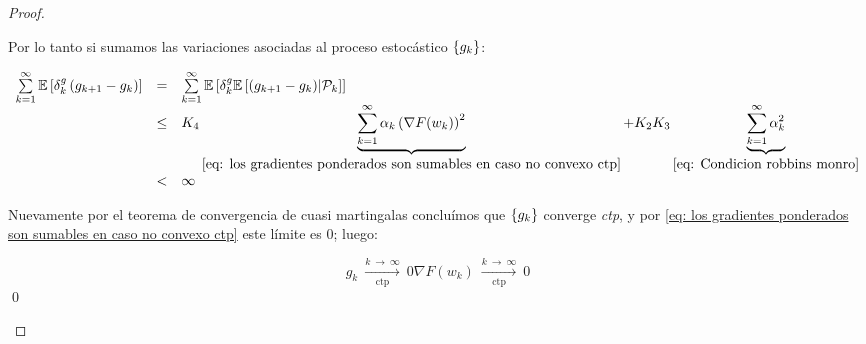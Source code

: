 \begin{proof}
\begin{enumerate}
		 Por lo tanto si sumamos las variaciones asociadas al proceso estoc\'astico $\left\lbrace g_k\right\rbrace$:
		 
		 \begin{equation}
		 \begin{array}{rcl}
		 \sum\limits_{k=1}^{\infty} {\mathbb{E} \left[\delta_k^{g} \left(g_{k+1} - g_k\right)\right]} & = & \sum\limits_{k=1}^{\infty} {\mathbb{E} \left[\delta_k^{g} \mathbb{E} \left[{\left(g_{k+1} - g_k\right)} \vert \mathcal{P}_{k}\right]\right]} \\
		 & \leq & K_4 \underbrace{\sum\limits_{k=1}^{\infty} {\alpha_k \left(\nabla F(w_k)\right)^2}}_{\ref{eq: los gradientes ponderados son sumables en caso no convexo ctp}} + K_2K_3 \underbrace{\sum\limits_{k=1}^{\infty} {\alpha_k^2}}_{\ref{eq: Condicion robbins monro}} \\
		 & < &  \infty
		 \end{array}
		 \end{equation}
		 
		 Nuevamente por el teorema de convergencia de cuasi martingalas conclu\'imos que $\left\lbrace g_k\right\rbrace$ converge \textit{ctp}, y por \ref{eq: los gradientes ponderados son sumables en caso no convexo ctp} este l\'imite es $0$; luego:
		 
		 	\begin{subequations}
		 	\begin{equation}
		 	g_k \ \xrightarrow[\text{ctp}]{k \ \rightarrow \ \infty } \ 0
		 	\end{equation}
		 	\begin{equation}
		 	\nabla F(w_k) \ \xrightarrow[\text{ctp}]{k \ \rightarrow \ \infty } \ 0
		 	\end{equation}
		 \end{subequations}
		 \qed
	\end{enumerate}
	
\end{proof}